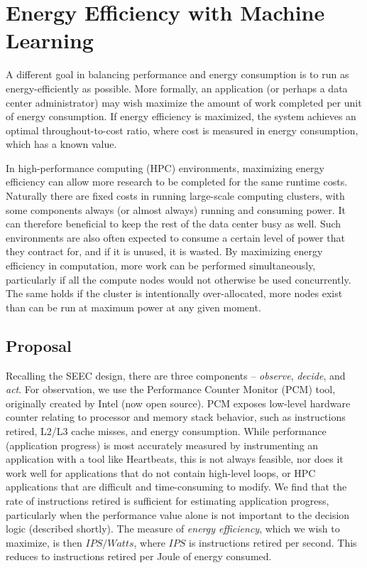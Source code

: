 \section{Energy Efficiency with Machine Learning}

A different goal in balancing performance and energy consumption is to run as energy-efficiently as possible.
More formally, an application (or perhaps a data center administrator) may wish maximize the amount of work completed per unit of energy consumption.
If energy efficiency is maximized, the system achieves an optimal throughout-to-cost ratio, where cost is measured in energy consumption, which has a known value.

In high-performance computing (HPC) environments, maximizing energy efficiency can allow more research to be completed for the same runtime costs.
Naturally there are fixed costs in running large-scale computing clusters, with some components always (or almost always) running and consuming power.
It can therefore beneficial to keep the rest of the data center busy as well.
Such environments are also often expected to consume a certain level of power that they contract for, and if it is unused, it is wasted.
By maximizing energy efficiency in computation, more work can be performed simultaneously, particularly if all the compute nodes would not otherwise be used concurrently.
The same holds if the cluster is intentionally over-allocated, \ie more nodes exist than can be run at maximum power at any given moment.





\subsection{Proposal}

Recalling the SEEC design, there are three components -- \emph{observe}, \emph{decide}, and \emph{act}.
For observation, we use the Performance Counter Monitor (PCM) tool, originally created by Intel (now open source).
PCM exposes low-level hardware counter relating to processor and memory stack behavior, such as instructions retired, L2/L3 cache misses, and energy consumption.
While performance (\ie application progress) is most accurately measured by instrumenting an application with a tool like Heartbeats, this is not always feasible, nor does it work well for applications that do not contain high-level loops, or HPC applications that are difficult and time-consuming to modify.
We find that the rate of instructions retired is sufficient for estimating application progress, particularly when the performance value alone is not important to the decision logic (described shortly).
The measure of \emph{energy efficiency}, which we wish to maximize, is then $IPS / Watts$, where $IPS$ is instructions retired per second.
This reduces to instructions retired per Joule of energy consumed.

